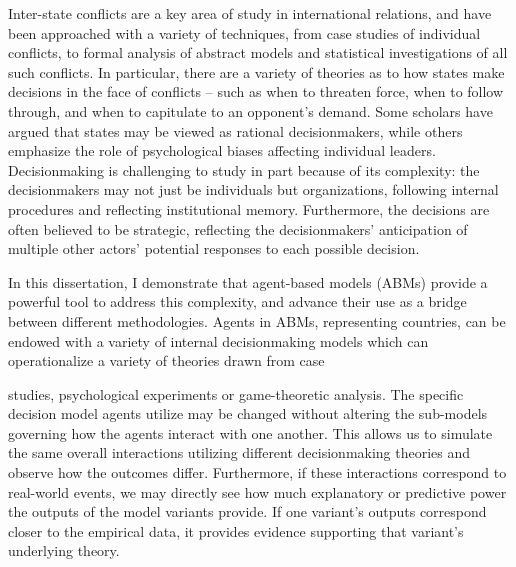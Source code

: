 \documentclass[11 pt]{report}
\begin{document}
\abstractpage

Inter-state conflicts are a key area of study in international relations, and have been approached with a variety of techniques, from case studies of individual conflicts, to formal analysis of abstract models and statistical investigations of all such conflicts. In particular, there are a variety of theories as to how states make decisions in the face of conflicts -- such as when to threaten force, when to follow through, and when to capitulate to an opponent's demand. Some scholars have argued that states may be viewed as rational decisionmakers, while others emphasize the role of psychological biases affecting individual leaders. Decisionmaking is challenging to study in part because of its complexity: the decisionmakers may not just be individuals but organizations, following internal procedures and reflecting institutional memory. Furthermore, the decisions are often believed to be strategic, reflecting the decisionmakers' anticipation of multiple other actors' potential responses to each possible decision.

In this dissertation, I demonstrate that agent-based models (ABMs) provide a powerful tool to address this complexity, and advance their use as a bridge between different methodologies. Agents in ABMs, representing countries, can be endowed with a variety of internal decisionmaking models which can operationalize a variety of theories drawn from case

\abstractmultiplepage
\noindent studies, psychological experiments or game-theoretic analysis. The specific decision model agents utilize may be changed without altering the sub-models governing how the agents interact with one another. This allows us to simulate the same overall interactions utilizing different decisionmaking theories and observe how the outcomes differ. Furthermore, if these interactions correspond to real-world events, we may directly see how much explanatory or predictive power the outputs of the model variants provide. If one variant's outputs correspond closer to the empirical data, it provides evidence supporting that variant's underlying theory.
\end{document}
